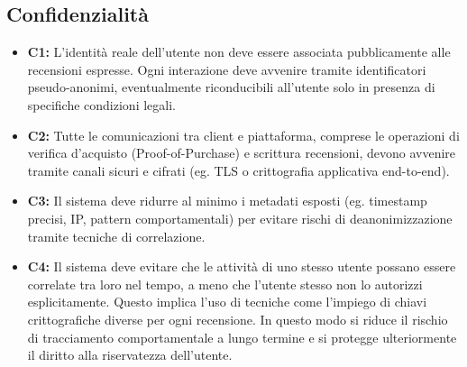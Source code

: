         \subsection{Confidenzialità}
            \begin{itemize}
                \item \textbf{C1:} L'identità reale dell'utente non deve essere associata pubblicamente alle recensioni espresse. Ogni interazione deve avvenire tramite identificatori pseudo-anonimi, eventualmente riconducibili all'utente solo in presenza di specifiche condizioni legali.
                
                \item \textbf{C2:} Tutte le comunicazioni tra client e piattaforma, comprese le operazioni di verifica d'acquisto (Proof-of-Purchase) e scrittura recensioni, devono avvenire tramite canali sicuri e cifrati (eg. TLS o crittografia applicativa end-to-end).
                
                \item \textbf{C3:} Il sistema deve ridurre al minimo i metadati esposti (eg. timestamp precisi, IP, pattern comportamentali) per evitare rischi di deanonimizzazione tramite tecniche di correlazione.

                \item \textbf{C4:} Il sistema deve evitare che le attività di uno stesso utente possano essere correlate tra loro nel tempo, a meno che l'utente stesso non lo autorizzi esplicitamente. Questo implica l'uso di tecniche come l'impiego di chiavi crittografiche diverse per ogni recensione. In questo modo si riduce il rischio di tracciamento comportamentale a lungo termine e si protegge ulteriormente il diritto alla riservatezza dell'utente.
            \end{itemize}

